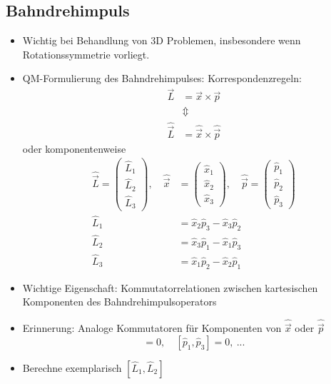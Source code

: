 \documentclass[10pt,article,colorback,accentcolor=tud9d]{scrartcl}
\begin{document}
\subsection{Bahndrehimpuls}
\begin{itemize}
	\item Wichtig bei Behandlung von 3D Problemen, insbesondere wenn Rotationssymmetrie vorliegt.
  \item QM-Formulierung des Bahndrehimpulses: Korrespondenzregeln: 
    \begin{align}
    \vec{L}&=\vec{x}\times\vec{p}\\
    &\Updownarrow \nonumber\\ 
    \hat{\vec{L}}&=\hat{\vec{x}}\times\hat{\vec{p}}
    \end{align}
    oder komponentenweise
    \begin{align}
    \hat{\vec{L}}=\left(\begin{array}{c} \hat{L}_1 \\ \hat{L}_2 \\ \hat{L}_3\end{array}\right),\quad
     \hat{\vec{x}}&=\left(\begin{array}{c} \hat{x}_1 \\ \hat{x}_2 \\ \hat{x}_3\end{array}\right), \quad
     \hat{\vec{p}}=\left(\begin{array}{c} \hat{p}_1 \\ \hat{p}_2 \\ \hat{p}_3\end{array}\right)\\
    \hat{L}_1&=\hat{x}_2\hat{p}_3-\hat{x}_3\hat{p}_2\\
    \hat{L}_2&=\hat{x}_3\hat{p}_1-\hat{x}_1\hat{p}_3\\
    \hat{L}_3&=\hat{x}_1\hat{p}_2-\hat{x}_2\hat{p}_1
    \end{align}
  \item Wichtige Eigenschaft: Kommutatorrelationen zwischen kartesischen Komponenten des Bahndrehimpulsoperators
  \item Erinnerung: Analoge Kommutatoren für Komponenten von  $\hat{\vec{x}}$ oder $\hat{\vec{p}}$
    \begin{equation}
    [\hat{p}_1,\hat{p}_2]=0,\quad  [\hat{p}_1,\hat{p}_3]=0,\ ...
    \end{equation}
  \item Berechne exemplarisch $[\hat{L}_1,\hat{L}_2]$
    \begin{align}

\end{align}
\end{itemize}
\end{document}
